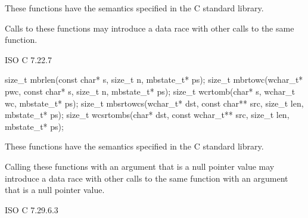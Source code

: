 \begin{itemdescr}
\pnum
\effects
These functions have the semantics specified in the C standard library.

\pnum
\remarks
Calls to these functions
may introduce a data race
with other calls to the same function.
\end{itemdescr}

\xref ISO C 7.22.7

%
%
%
%
%
\begin{itemdecl}
size_t mbrlen(const char* s, size_t n, mbstate_t* ps);
size_t mbrtowc(wchar_t* pwc, const char* s, size_t n, mbstate_t* ps);
size_t wcrtomb(char* s, wchar_t wc, mbstate_t* ps);
size_t mbsrtowcs(wchar_t* dst, const char** src, size_t len, mbstate_t* ps);
size_t wcsrtombs(char* dst, const wchar_t** src, size_t len, mbstate_t* ps);
\end{itemdecl}

\begin{itemdescr}
\pnum
\effects
These functions have the semantics specified in the C standard library.

\pnum
\remarks
Calling these functions
with an  argument that is a null pointer value
may introduce a data race
with other calls to the same function
with an  argument that is a null pointer value.
\end{itemdescr}

\xref ISO C 7.29.6.3
